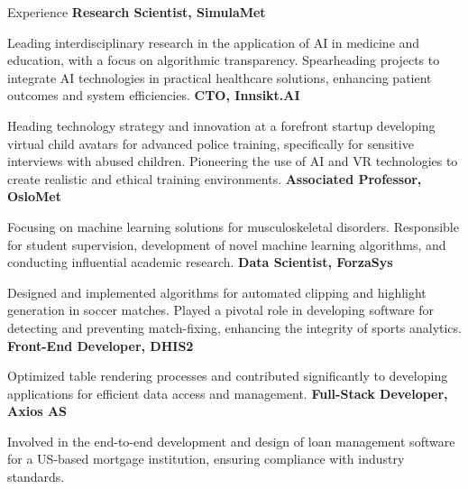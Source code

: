 \begin{rubric}{Experience}
%
\entry*[2021 -- present]%
\textbf{Research Scientist, SimulaMet} \par
Leading interdisciplinary research in the application of AI in medicine and education, with a focus on algorithmic transparency.
Spearheading projects to integrate AI technologies in practical healthcare solutions, enhancing patient outcomes and system efficiencies.
%
\entry*[2023 -- present]%
\textbf{CTO, Innsikt.AI} \par
Heading technology strategy and innovation at a forefront startup developing virtual child avatars for advanced police training, specifically for sensitive interviews with abused children.
Pioneering the use of AI and VR technologies to create realistic and ethical training environments.
%
\entry*[2023 -- present]%
\textbf{Associated Professor, OsloMet} \par
Focusing on machine learning solutions for musculoskeletal disorders.
Responsible for student supervision, development of novel machine learning algorithms, and conducting influential academic research.
%
\entry*[2022 -- 2023]%
\textbf{Data Scientist, ForzaSys} \par
Designed and implemented algorithms for automated clipping and highlight generation in soccer matches.
Played a pivotal role in developing software for detecting and preventing match-fixing, enhancing the integrity of sports analytics.
%
\entry*[2017 -- 2018]%
\textbf{Front-End Developer, DHIS2} \par
Optimized table rendering processes and contributed significantly to developing applications for efficient data access and management.
%
\entry*[2014 -- 2016]%
\textbf{Full-Stack Developer, Axios AS} \par
Involved in the end-to-end development and design of loan management software for a US-based mortgage institution, ensuring compliance with industry standards.
%
\end{rubric}